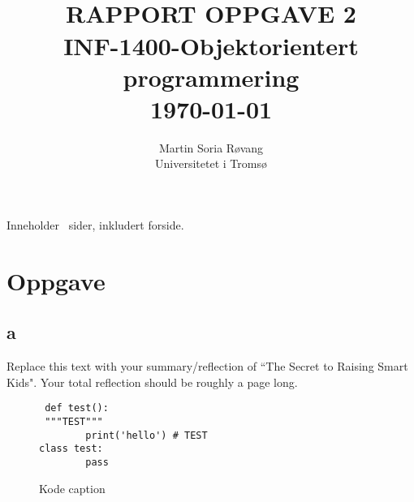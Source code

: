 




{\selectfont
\title{ \normalsize \textsc{}
		\\ [3.0cm] %
        \LARGE \textbf{\uppercase{Rapport Oppgave 2}
        \HRule{0.5pt} \\ [0.5cm]
        INF-1400-Objektorientert programmering
        \\
		\normalsize \today \vspace*{5\baselineskip}}
		}

        \date{}
\author{
		Martin Soria Røvang \\ 
        Universitetet i Tromsø \\}

\clearpage\maketitle
\vspace{0.2\textheight}
{\centering
Inneholder \pageref{LastPage} \, sider, inkludert forside.\par
}
\thispagestyle{empty}

\newpage
\tableofcontents


\newpage

\section{Oppgave}
\subsection{a}

Replace this text with your summary/reflection of ``The Secret to Raising Smart Kids".  Your total reflection should be roughly a page long.

\begin{figure}[hbt!]
    \begin{lstlisting}
 def test():
 """TEST"""
        print('hello') # TEST
class test:
        pass
    \end{lstlisting}
\caption{Kode caption}
\label{Kode1}
\end{figure}


}
